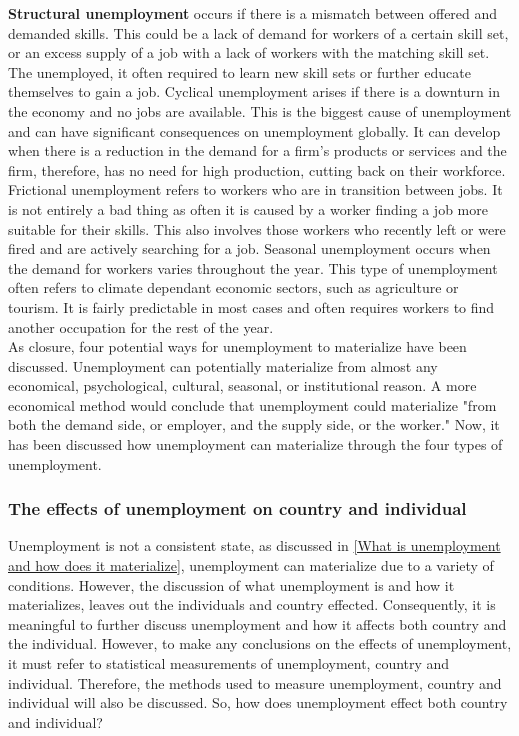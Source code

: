 \textbf{Structural unemployment} occurs if there is a mismatch between offered and demanded skills.
This could be a lack of demand for workers of a certain skill set, or an excess supply of a job with a lack of workers with the matching skill set.
The unemployed, it often required to learn new skill sets or further educate themselves to gain a job.
Cyclical unemployment arises if there is a downturn in the economy and no jobs are available.
This is the biggest cause of unemployment and can have significant consequences on unemployment globally. \cite{Understanding_four_types_of_unemployment}
It can develop when there is a reduction in the demand for a firm's products or services and the firm, therefore, has no need for high production, cutting back on their workforce. 
Frictional unemployment refers to workers who are in transition between jobs. 
It is not entirely a bad thing as often it is caused by a worker finding a job more suitable for their skills.
This also involves those workers who recently left or were fired and are actively searching for a job.
Seasonal unemployment occurs when the demand for workers varies throughout the year.
This type of unemployment often refers to climate dependant economic sectors, such as agriculture or tourism.
It is fairly predictable in most cases and often requires workers to find another occupation for the rest of the year. \\

As closure, four potential ways for unemployment to materialize have been discussed.
Unemployment can potentially materialize from almost any economical, psychological, cultural, seasonal, or institutional reason. 
A more economical method would conclude that unemployment could materialize "from both the demand side, or employer, and the supply side, or the worker." \cite{Economical_theory_behind_unemployment}
Now, it has been discussed how unemployment can materialize through the four types of unemployment. \cite{Guide_to_unemployment} \\

\subsubsection{The effects of unemployment on country and individual} \label{The effects of unemployment on country and individual}
Unemployment is not a consistent state, as discussed in \ref{What is unemployment and how does it materialize}, unemployment can materialize due to a variety of conditions.
However, the discussion of what unemployment is and how it materializes, leaves out the individuals and country effected.
Consequently, it is meaningful to further discuss unemployment and how it affects both country and the individual.
However, to make any conclusions on the effects of unemployment, it must refer to statistical measurements of unemployment, country and individual. 
Therefore, the methods used to measure unemployment, country and individual will also be discussed.
So, how does unemployment effect both country and individual? \\

